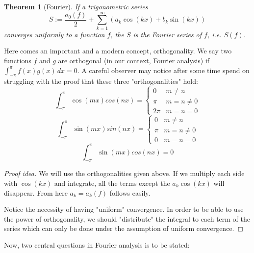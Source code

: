 \documentclass[12pt]{amsart}
\newtheorem{theorem}{Theorem}[section]
\theoremstyle{definition}
\begin{document}
\begin{theorem}[Fourier]
    If a trigonometric series
    \[
    S := \frac{a_0(f)}{2} +  \sum_{k = 1}^{\infty} (a_k  \cos(kx) + b_k  \sin(kx))
    \]
   converges uniformly to a function \(f\), the $S$ is the Fourier series of \(f\), i.e. $S(f)$.
\end{theorem}

    Here comes an important and a modern concept, orthogonality\footnotemark{}. We say two functions $f$ and $g$ are orthogonal (in our context, Fourier analysis) if $\int_{-\pi}^{\pi} f(x)g(x)\,dx = 0$. A careful observer may notice after some time spend on struggling with the proof that these three "orthogonalities" hold:
    \[
    \int_{-\pi}^{\pi} \cos(mx)cos(nx) = \begin{cases}
                                        0 & m \neq n \\
                                      \pi &  m = n \neq 0\\
                                     2\pi & m = n = 0
                                        \end{cases}
    \]
    \[
    \int_{-\pi}^{\pi} \sin(mx)sin(nx) = \begin{cases}
                                        0 & m \neq n \\
                                      \pi &  m = n \neq 0\\
                                        0 & m = n = 0
                                        \end{cases}
    \]
    \[
    \int_{-\pi}^{\pi} \sin(mx)cos(nx) = 0
    \]



\begin{proof}[Proof idea]
    We will use the orthogonalities given above. If we multiply each side with $\cos(kx)$ and integrate, all the terms except the $a_k \cos(kx)$ will disappear. From here $a_k = a_k(f)$ follows easily. \par
     Notice the necessity of having "uniform" convergence. In order to be able to use the power of orthogonality, we should "distribute" the integral to each term of the series which can only be done under the assumption of uniform convergence.
\end{proof}


    Now, two central questions in Fourier analysis is to be stated:
\end{document}
